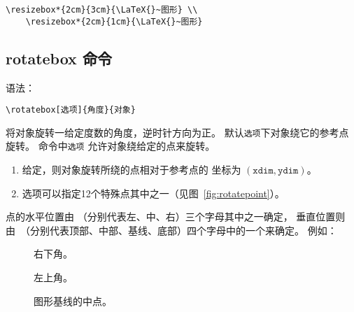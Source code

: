 \hspace{-2cm}\begin{minipage}[b]{.5\textwidth}
	\begin{center}
		\par\vspace{0pt}
	\end{center}
\end{minipage}%
\begin{minipage}[b]{.5\textwidth}
	\begin{Verbatim}[formatcom=\color{VerbatimColor}\CJKfamily{kai}]
	\resizebox*{2cm}{3cm}{\LaTeX{}~图形} \\
	\resizebox*{2cm}{1cm}{\LaTeX{}~图形}
	\end{Verbatim}
	\par\vspace{0pt}
\end{minipage}

\subsection{rotatebox 命令}\label{ssec:rotatebox}
语法：
\begin{lstlisting}
\rotatebox[选项]{角度}{对象}
\end{lstlisting}
 将对象旋转一给定度数的角度，逆时针方向为正。
默认\texttt{选项}下对象绕它的参考点旋转。
 命令中\texttt{选项} 允许对象绕给定的点来旋转。
\begin{enumerate}
	\item 给定\opt{[x=xdim,y=ydim]}，则对象旋转所绕的点相对于参考点的
	坐标为 $(\mathtt{xdim}, \mathtt{ydim})$。
	\item {} 选项可以指定12个特殊点其中之一（见图~\ref{fig:rotatepoint}）。
\end{enumerate}

 点的水平位置由 （分别代表左、中、右）三个字母其中之一确定，
垂直位置则由~（分别代表顶部、中部、基线、底部）四个字母中的一个来确定。
例如：
\begin{description}
	\item [\opt{[rb]}] 右下角。
	\item [\opt{[lt]}] 左上角。
	\item [\opt{[cB]}] 图形基线的中点。
\end{description}

